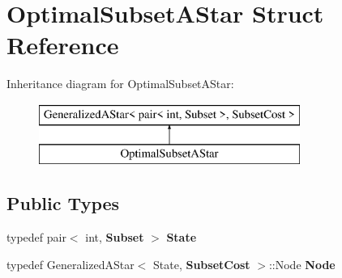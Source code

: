 \section{Optimal\+Subset\+A\+Star Struct Reference}
\label{structOptimalSubsetAStar}
Inheritance diagram for Optimal\+Subset\+A\+Star\+:\begin{figure}[H]
\begin{center}
\leavevmode
\includegraphics[height=2.000000cm]{structOptimalSubsetAStar}
\end{center}
\end{figure}
\subsection*{Public Types}
\begin{DoxyCompactItemize}
\item 
typedef pair$<$ int, {\bf Subset} $>$ {\bfseries State}\label{structOptimalSubsetAStar_a5e7da724c886144bbf47e2870eb42dff}

\item 
typedef Generalized\+A\+Star$<$ State, {\bf Subset\+Cost} $>$\+::Node {\bfseries Node}\label{structOptimalSubsetAStar_a796b87b95ae65f83786e494d189d217d}

\end{DoxyCompactItemize}
